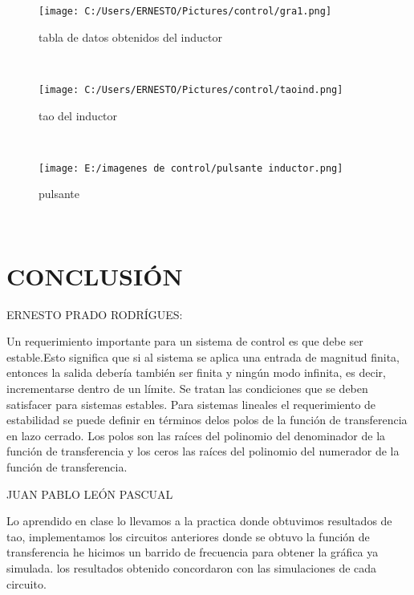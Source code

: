 \documentclass{article}
\begin{document}
\begin{figure}
	\centering
	\texttt{[image: C:/Users/ERNESTO/Pictures/control/gra1.png]}
	\caption{tabla de datos obtenidos del inductor}	
\end{figure}\\
\begin{figure}
	\centering
	\texttt{[image: C:/Users/ERNESTO/Pictures/control/taoind.png]}
	\caption{tao del inductor}	
\end{figure}\\
\begin{figure}
	\centering
	\texttt{[image: E:/imagenes de control/pulsante inductor.png]}
	\caption{pulsante}	
\end{figure}\\

\newpage
\newpage\section{CONCLUSIÓN}
ERNESTO PRADO RODRÍGUES:

Un requerimiento importante para un sistema de control es que debe ser estable.Esto significa que si al sistema se aplica una entrada de magnitud finita, entonces la salida debería también ser finita y ningún modo infinita, es decir, incrementarse dentro de un límite. Se tratan las condiciones que se deben satisfacer para sistemas estables. Para sistemas lineales el requerimiento de estabilidad se puede definir en términos delos polos de la función de transferencia en lazo cerrado. Los polos son las raíces del polinomio del denominador de la función de transferencia y los ceros las raíces del polinomio del numerador de la función de transferencia.

JUAN PABLO LEÓN PASCUAL

Lo aprendido en clase lo llevamos a la practica donde obtuvimos resultados de tao, implementamos los circuitos anteriores donde se obtuvo  la función de transferencia he hicimos un barrido de frecuencia para obtener la gráfica ya simulada. los resultados obtenido concordaron con las simulaciones de cada circuito.
\end{document}
